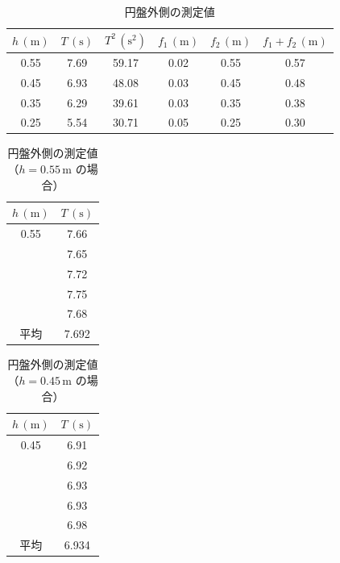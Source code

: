 \documentclass{jlreq}
\begin{document}
\begin{table}[htbp]
  \centering
  \caption{円盤外側の測定値}
  \renewcommand{\arraystretch}{1.2} %
  \setlength{\tabcolsep}{6pt}       %
  \begin{tabular}{|c|c|c|c|c|c|}
    \hline
    \textbf{$h\,(\mathrm{m})$} & 
    \textbf{$T\,(\mathrm{s})$} & 
    \textbf{$T^2\,(\mathrm{s^2})$} & 
    \textbf{$f_1\,(\mathrm{m})$} & 
    \textbf{$f_2\,(\mathrm{m})$} & 
    \textbf{$f_1+f_2\,(\mathrm{m})$} \\ \hline
    0.55 & 7.69 & 59.17 & 0.02 & 0.55 & 0.57 \\ \hline
    0.45 & 6.93 & 48.08 & 0.03 & 0.45 & 0.48 \\ \hline
    0.35 & 6.29 & 39.61 & 0.03 & 0.35 & 0.38 \\ \hline
    0.25 & 5.54 & 30.71 & 0.05 & 0.25 & 0.30 \\ \hline
  \end{tabular}
  \label{tab:disk_outer}
\end{table}



\begin{table}[htbp]
  \centering
  \caption{円盤外側の測定値（$h=0.55\,\mathrm{m}$ の場合）}
  \renewcommand{\arraystretch}{1.2} %
  \setlength{\tabcolsep}{6pt}       %
  \begin{tabular}{|c|c|}
    \hline
    \textbf{$h\,(\mathrm{m})$} & \textbf{$T\,(\mathrm{s})$} \\ \hline
    0.55 & 7.66 \\ \hline
         & 7.65 \\ \hline
         & 7.72 \\ \hline
         & 7.75 \\ \hline
         & 7.68 \\ \hline
    平均 & 7.692 \\ \hline
  \end{tabular}
  \label{tab:disk_outer_0.55}
\end{table}




\begin{table}[htbp]
  \centering
  \caption{円盤外側の測定値（$h=0.45\,\mathrm{m}$ の場合）}
  \renewcommand{\arraystretch}{1.2} %
  \setlength{\tabcolsep}{6pt}       %
  \begin{tabular}{|c|c|}
    \hline
    \textbf{$h\,(\mathrm{m})$} & \textbf{$T\,(\mathrm{s})$} \\ \hline
    0.45 & 6.91 \\ \hline
         & 6.92 \\ \hline
         & 6.93 \\ \hline
         & 6.93 \\ \hline
         & 6.98 \\ \hline
    平均 & 6.934 \\ \hline
  \end{tabular}
  \label{tab:disk_outer_0.45}
\end{table}
\end{document}
